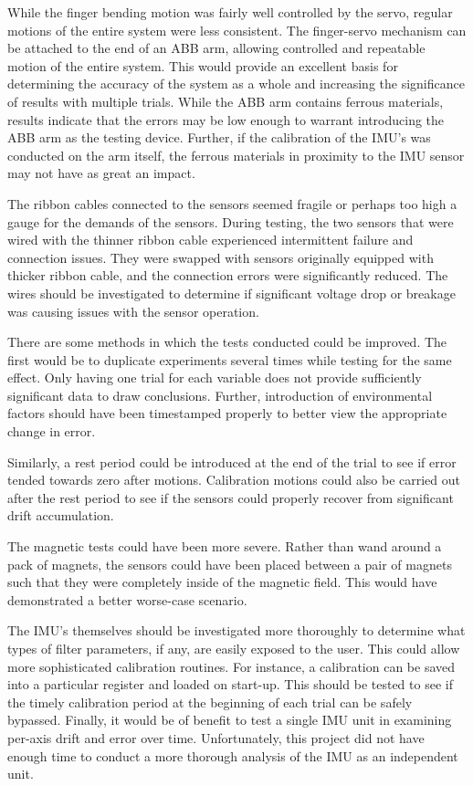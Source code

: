 \documentclass[letterpaper, 10 pt, conference]{ieeeconf}  %
\begin{document}
While the finger bending motion was fairly well controlled by the servo, regular motions of the entire system were less consistent. The finger-servo mechanism can be attached to the end of an ABB arm, allowing controlled and repeatable motion of the entire system. This would provide an excellent basis for determining the accuracy of the system as a whole and increasing the significance of results with multiple trials. While the ABB arm contains ferrous materials, results indicate that the errors may be low enough to warrant introducing the ABB arm as the testing device. Further, if the calibration of the IMU's was conducted on the arm itself, the ferrous materials in proximity to the IMU sensor may not have as great an impact.

The ribbon cables connected to the sensors seemed fragile or perhaps too high a gauge for the demands of the sensors. During testing, the two sensors that were wired with the thinner ribbon cable experienced intermittent failure and connection issues. They were swapped with sensors originally equipped with thicker ribbon cable, and the connection errors were significantly reduced. The wires should be investigated to determine if significant voltage drop or breakage was causing issues with the sensor operation.

There are some methods in which the tests conducted could be improved. The first would be to duplicate experiments several times while testing for the same effect. Only having one trial for each variable does not provide sufficiently significant data to draw conclusions. Further, introduction of environmental factors should have been timestamped properly to better view the appropriate change in error. 

Similarly, a rest period could be introduced at the end of the trial to see if error tended towards zero after motions. Calibration motions could also be carried out after the rest period to see if the sensors could properly recover from significant drift accumulation. 

The magnetic tests could have been more severe. Rather than wand around a pack of magnets, the sensors could have been placed between a pair of magnets such that they were completely inside of the magnetic field. This would have demonstrated a better worse-case scenario.

The IMU's themselves should be investigated more thoroughly to determine what types of filter parameters, if any, are easily exposed to the user. This could allow more sophisticated calibration routines. For instance, a calibration can be saved into a particular register and loaded on start-up. This should be tested to see if the timely calibration period at the beginning of each trial can be safely bypassed. Finally, it would be of benefit to test a single IMU unit in examining per-axis drift and error over time. Unfortunately, this project did not have enough time to conduct a more thorough analysis of the IMU as an independent unit.
\end{document}

